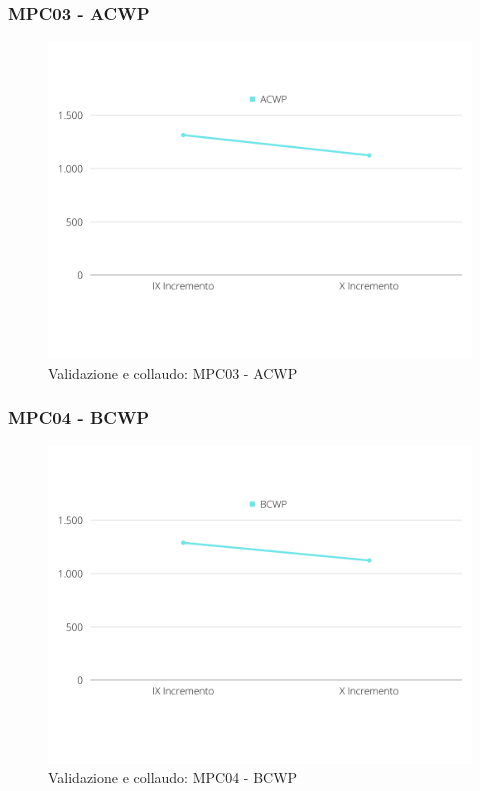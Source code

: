 \subsubsection{MPC03 - ACWP}
\begin{figure}[H]
    \centering
    \includegraphics[scale=0.50]{Sezioni/images/vc-ACWP.png}
    \caption{Validazione e collaudo: MPC03 - ACWP}
\end{figure}

\subsubsection{MPC04 - BCWP}
\begin{figure}[H]
    \centering
    \includegraphics[scale=0.50]{Sezioni/images/vc-BCWP.png}
    \caption{Validazione e collaudo: MPC04 - BCWP}
\end{figure}

